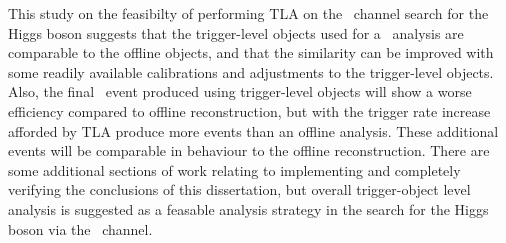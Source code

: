 This study on the feasibilty of performing TLA on the \VBFHBB\ channel search for the Higgs boson suggests that the trigger-level objects used for a \VBFHBB\ analysis are comparable to the offline objects, and that the similarity can be improved with some readily available calibrations and adjustments to the trigger-level objects. Also, the final \VBFHBB\ event produced using trigger-level objects will show a worse efficiency compared to offline reconstruction, but with the trigger rate increase afforded by TLA produce more events than an offline analysis. These additional events will be comparable in behaviour to the offline reconstruction. There are some additional sections of work relating to implementing and completely verifying the conclusions of this dissertation, but overall trigger-object level analysis is suggested as a feasable analysis strategy in the search for the Higgs boson via the \VBFHBB\ channel.
